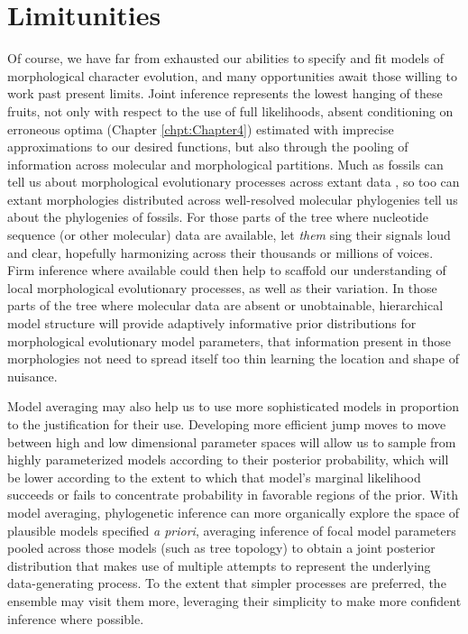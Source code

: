 \clearpage

\section{Limitunities}

Of course, we have far from exhausted our abilities to specify and fit models of morphological character evolution, and many opportunities await those willing to work past present limits. Joint inference represents the lowest hanging of these fruits, not only with respect to the use of full likelihoods, absent conditioning on erroneous optima (Chapter \ref{chpt:Chapter4}) estimated with imprecise approximations to our desired functions, but also through the pooling of information across molecular and morphological partitions. Much as fossils can tell us about morphological evolutionary processes across extant data \citep{slaterIntegratingFossilsMolecular2012}, so too can extant morphologies distributed across well-resolved molecular phylogenies tell us about the phylogenies of fossils. For those parts of the tree where nucleotide sequence (or other molecular) data are available, let \textit{them} sing their signals loud and clear, hopefully harmonizing across their thousands or millions of voices. Firm inference where available could then help to scaffold our understanding of local morphological evolutionary processes, as well as their variation. In those parts of the tree where molecular data are absent or unobtainable, hierarchical model structure will provide adaptively informative prior distributions for morphological evolutionary model parameters, that information present in those morphologies not need to spread itself too thin learning the location and shape of nuisance.

Model averaging may also help us to use more sophisticated models in proportion to the justification for their use. Developing more efficient jump moves \citep{huelsenbeckBayesianPhylogeneticModel2004} to move between high and low dimensional parameter spaces will allow us to sample from highly parameterized models according to their posterior probability, which will be lower according to the extent to which that model's marginal likelihood succeeds or fails to concentrate probability in favorable regions of the prior. With model averaging, phylogenetic inference can more organically explore the space of plausible models specified \textit{a priori}, averaging inference of focal model parameters pooled across those models (such as tree topology) to obtain a joint posterior distribution that makes use of multiple attempts to represent the underlying data-generating process. To the extent that simpler processes are preferred, the ensemble may visit them more, leveraging their simplicity to make more confident inference where possible.

